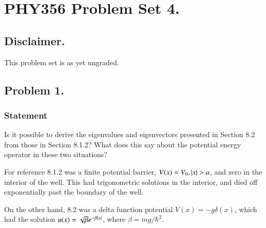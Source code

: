 %
%
%
%
%
%

\chapter{PHY356 Problem Set 4.}
\label{chap:qmIproblemSet4}
{}
\date{Nov 16, 2010}

\beginArtNoToc
\section{Disclaimer.}

This problem set is as yet ungraded.

\section{Problem 1.}
\subsection{Statement}

Is it possible to derive the eigenvalues and eigenvectors presented in Section 8.2 from those in Section 8.1.2?  What does this say about the potential energy operator in these two situations?

For reference 8.1.2 was a finite potential barrier, $V(x) = V_0, \left\lvert{x}\right\rvert > a$, and zero in the interior of the well.  This had trigonometric solutions in the interior, and died off exponentially past the boundary of the well.

On the other hand, 8.2 was a delta function potential $V(x) = -g \delta(x)$, which had the solution $u(x) = \sqrt{\beta} e^{-\beta \left\lvert{x}\right\rvert}$, where $\beta = m g/\hbar^2$.



